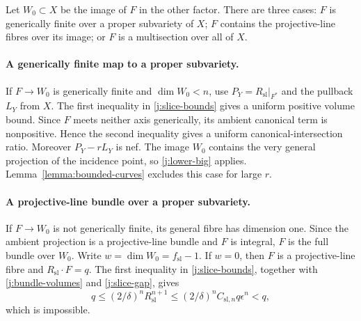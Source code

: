 Let $W_0\subset X$ be the image of $F$ in the other factor.
There are three cases: $F$ is generically finite over a proper
subvariety of $X$; $F$ contains the projective-line fibres over its
image; or $F$ is a multisection over all of $X$.

\paragraph{A generically finite map to a proper subvariety.}
If $F\to W_0$ is generically finite and $\dim W_0<n$, use
$P_Y=R_{\mathrm{sl}}|_{F^*}$ and the pullback $L_Y$ from $X$.
The first inequality in \eqref{j:slice-bounds} gives a uniform
positive volume bound. Since $F$ meets neither axis generically,
its ambient canonical term is nonpositive. Hence the second
inequality gives a uniform canonical-intersection ratio.
Moreover $P_Y-rL_Y$ is nef. The image $W_0$ contains the very
general projection of the incidence point, so
\eqref{j:lower-big} applies. Lemma~\ref{lemma:bounded-curves}
excludes this case for large $r$.

\paragraph{A projective-line bundle over a proper subvariety.}
If $F\to W_0$ is not generically finite, its general fibre has
dimension one. Since the ambient projection is a projective-line
bundle and $F$ is integral, $F$ is the full bundle over $W_0$.
Write $w=\dim W_0=f_{\mathrm{sl}}-1$.
If $w=0$, then $F$ is a projective-line fibre and
$R_{\mathrm{sl}}\cdot F=q$. The first inequality in
\eqref{j:slice-bounds}, together with
\eqref{j:bundle-volumes} and \eqref{j:slice-gap}, gives
\[
 q\le(2/\delta)^nR_{\mathrm{sl}}^{n+1}
   \le(2/\delta)^n C_{\mathrm{sl},n}q\epsilon^n<q,
\]
which is impossible.

